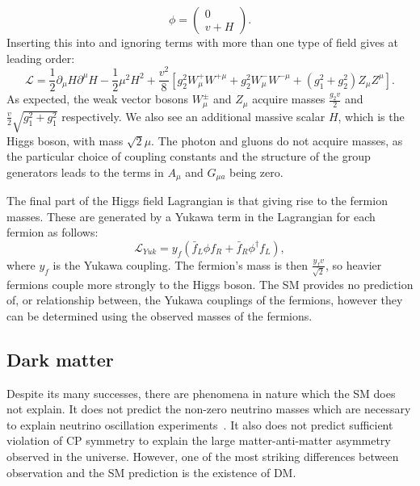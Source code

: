\begin{equation}
  \phi=\left(\begin{array}{c}0 \\ v+H \end{array}\right).
\end{equation}
Inserting this into  and ignoring terms with more than one type of field gives at leading order:
\begin{equation}
  \mathcal{L}=\frac{1}{2}\partial_{\mu}H\partial^{\mu}H-\frac{1}{2}\mu^{2}H^{2}+\frac{v^{2}}{8}\left[g_{2}^{2}W_{\mu}^{+}W^{+\mu}+g_{2}^{2}W_{\mu}^{-}W^{-\mu}+\left(g_{1}^{2}+g_{2}^{2}\right)Z_{\mu}Z^{\mu}\right].
\end{equation}
As expected, the weak vector bosons $W_{\mu}^{\pm}$ and $Z_{\mu}$ acquire masses $\frac{g_{2}v}{2}$ and $\frac{v}{2}\sqrt{g_{1}^{2}+g_{1}^{2}}$ respectively. We also see an additional massive scalar $H$, which is the Higgs boson, with mass $\sqrt{2}\mu$. The photon and gluons do not acquire masses, as the particular choice of coupling constants and the structure of the group generators leads to the terms in $A_{\mu}$ and $G_{\mu a}$ being zero.

The final part of the Higgs field Lagrangian is that giving rise to the fermion masses. These are generated by a Yukawa term in the Lagrangian for each fermion as follows:
\begin{equation}
  \mathcal{L}_{Yuk}=y_{f}\left(\bar{f}_{L}\phi f_{R}+\bar{f}_{R}\phi^{\dag}f_{L}\right),
\end{equation}
where $y_{f}$ is the Yukawa coupling. The fermion's mass is then $\frac{y_{f}v}{\sqrt{2}}$, so heavier fermions couple more strongly to the Higgs boson. The \ac{SM} provides no prediction of, or relationship between, the Yukawa couplings of the fermions, however they can be determined using the observed masses of the fermions.


\subsection{Dark matter}
\label{sec:DM}
Despite its many successes, there are phenomena in nature which the \ac{SM} does not explain. It does not predict the non-zero neutrino masses which are necessary to explain neutrino oscillation experiments~\cite{pdg}. It also does not predict sufficient violation of CP symmetry to explain the large matter-anti-matter asymmetry observed in the universe. However, one of the most striking differences between observation and the \ac{SM} prediction is the existence of \ac{DM}.

